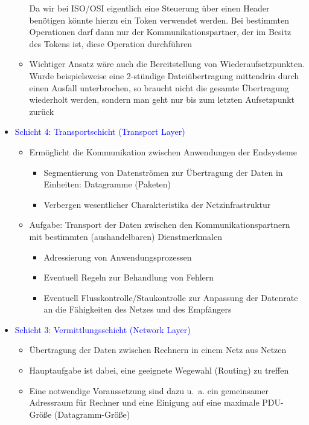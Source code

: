 \begin{itemize}
\begin{itemize}
        Da wir bei ISO/OSI eigentlich eine Steuerung über einen Header benötigen könnte hierzu ein Token verwendet werden.
        Bei bestimmten Operationen darf dann nur der Kommunikationspartner, der im Besitz des Tokens ist, diese Operation durchführen
        \item Wichtiger Ansatz wäre auch die Bereitstellung von Wiederaufsetzpunkten.
        Wurde beispielsweise eine 2-stündige Dateiübertragung mittendrin durch einen Ausfall unterbrochen, so braucht nicht die gesamte Übertragung wiederholt werden, sondern man geht nur bis zum letzten Aufsetzpunkt zurück
    \end{itemize}
    \item \textcolor{blue}{Schicht 4: Transportschicht (Transport Layer)}
    \begin{itemize}
        \item Ermöglicht die Kommunikation zwischen Anwendungen der Endsysteme
        \begin{itemize}
            \item Segmentierung von Datenströmen zur Übertragung der Daten in Einheiten: Datagramme (Paketen)
            \item Verbergen wesentlicher Charakteristika der Netzinfrastruktur
        \end{itemize}
        \item Aufgabe: Transport der Daten zwischen den Kommunikationspartnern mit bestimmten (aushandelbaren) Dienstmerkmalen
        \begin{itemize}
            \item Adressierung von Anwendungsprozessen
            \item Eventuell Regeln zur Behandlung von Fehlern
            \item Eventuell Flusskontrolle/Staukontrolle zur Anpassung der Datenrate an die Fähigkeiten des Netzes und des Empfängers
        \end{itemize}
    \end{itemize}
    \item \textcolor{blue}{Schicht 3: Vermittlungsschicht (Network Layer)}
    \begin{itemize}
        \item Übertragung der Daten zwischen Rechnern in einem Netz aus Netzen
        \item Hauptaufgabe ist dabei, eine geeignete Wegewahl (Routing) zu treffen
        \item Eine notwendige Voraussetzung sind dazu u.\ a. ein gemeinsamer Adressraum für Rechner und eine Einigung auf eine maximale PDU-Größe (Datagramm-Größe)

\end{itemize}
\end{itemize}

